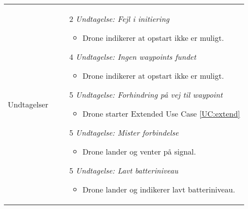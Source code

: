 \documentclass[Main]{subfiles}
\begin{document}
\begin{longtable}{|p{}|p{}|}
Undtagelser & \vspace{-8mm}

	\begin{enumerate}[noitemsep,nolistsep,leftmargin=*]
	\item[2] \textit{Undtagelse: Fejl i initiering}
	
		\begin{itemize}[noitemsep,nolistsep]
		\item Drone indikerer at opstart ikke er muligt.
		\end{itemize}
	
	\end{enumerate}


	\begin{enumerate}[noitemsep,nolistsep,leftmargin=*]
	\item[4] \textit{Undtagelse: Ingen waypoints fundet}
		\begin{itemize}[noitemsep,nolistsep]
		\item Drone indikerer at opstart ikke er muligt.
		\end{itemize}
		
	\end{enumerate}
	
	
	\begin{enumerate}[noitemsep,nolistsep,leftmargin=*]
	\item[5] \textit{Undtagelse: Forhindring på vej til waypoint}
		\begin{itemize}[noitemsep,nolistsep]
		\item Drone starter Extended Use Case \ref{UC:extend}
		\end{itemize}
	\end{enumerate}
	
	
	\begin{enumerate}[noitemsep,nolistsep,leftmargin=*]
	\item[5] \textit{Undtagelse: Mister forbindelse}
		\begin{itemize}[noitemsep,nolistsep]
		\item Drone lander og venter på signal.
		\end{itemize}
	\end{enumerate}


	\begin{enumerate}[noitemsep,nolistsep,leftmargin=*]
	\item[5] \textit{Undtagelse: Lavt batteriniveau}
		\begin{itemize}[noitemsep,nolistsep]
	\item Drone lander og indikerer lavt batteriniveau.
		\end{itemize}
	\end{enumerate}


\end{longtable}
\end{document}
